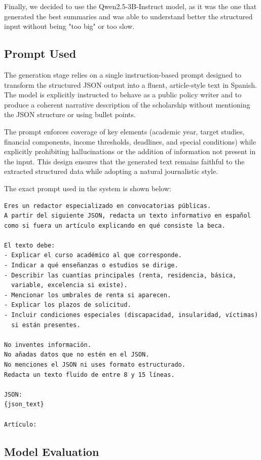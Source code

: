 \documentclass{article}
\begin{document}
Finally, we decided to use the Qwen2.5-3B-Instruct model, as it was the one that generated the best summaries and was able to understand better the structured input without being "too big" or too slow.

\subsection{Prompt Used}

The generation stage relies on a single instruction-based prompt designed to transform the structured JSON output into a fluent, article-style text in Spanish. The model is explicitly instructed to behave as a public policy writer and to produce a coherent narrative description of the scholarship without mentioning the JSON structure or using bullet points. 

The prompt enforces coverage of key elements (academic year, target studies, financial components, income thresholds, deadlines, and special conditions) while explicitly prohibiting hallucinations or the addition of information not present in the input. This design ensures that the generated text remains faithful to the extracted structured data while adopting a natural journalistic style.

The exact prompt used in the system is shown below:

\begin{verbatim}
Eres un redactor especializado en convocatorias públicas.
A partir del siguiente JSON, redacta un texto informativo en español 
como si fuera un artículo explicando en qué consiste la beca.

El texto debe:
- Explicar el curso académico al que corresponde.
- Indicar a qué enseñanzas o estudios se dirige.
- Describir las cuantías principales (renta, residencia, básica, 
  variable, excelencia si existe).
- Mencionar los umbrales de renta si aparecen.
- Explicar los plazos de solicitud.
- Incluir condiciones especiales (discapacidad, insularidad, víctimas) 
  si están presentes.

No inventes información.
No añadas datos que no estén en el JSON.
No menciones el JSON ni uses formato estructurado.
Redacta un texto fluido de entre 8 y 15 líneas.

JSON:
{json_text}

Artículo:
\end{verbatim}

\subsection{Model Evaluation}
\end{document}
